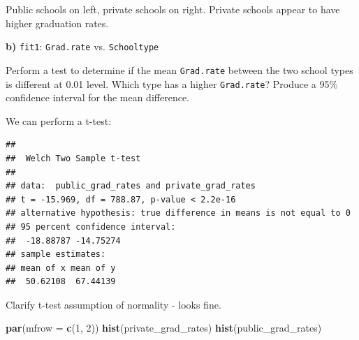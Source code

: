 \documentclass[]{article}
\newenvironment{Shaded}{\begin{snugshade}}{\end{snugshade}}
\newcommand{\KeywordTok}[1]{\textcolor[rgb]{0.13,0.29,0.53}{\textbf{#1}}}
\newcommand{\DataTypeTok}[1]{\textcolor[rgb]{0.13,0.29,0.53}{#1}}
\newcommand{\DecValTok}[1]{\textcolor[rgb]{0.00,0.00,0.81}{#1}}
\newcommand{\StringTok}[1]{\textcolor[rgb]{0.31,0.60,0.02}{#1}}
\newcommand{\OperatorTok}[1]{\textcolor[rgb]{0.81,0.36,0.00}{\textbf{#1}}}
\newcommand{\NormalTok}[1]{#1}
\begin{document}
Public schools on left, private schools on right. Private schools appear
to have higher graduation rates.

\textbf{b)} \texttt{fit1}: \texttt{Grad.rate} vs. \texttt{Schooltype}

Perform a test to determine if the mean \texttt{Grad.rate} between the
two school types is different at 0.01 level. Which type has a higher
\texttt{Grad.rate}? Produce a 95\% confidence interval for the mean
difference.

We can perform a t-test:

\begin{Shaded}
\end{Shaded}

\begin{verbatim}
## 
##  Welch Two Sample t-test
## 
## data:  public_grad_rates and private_grad_rates
## t = -15.969, df = 788.87, p-value < 2.2e-16
## alternative hypothesis: true difference in means is not equal to 0
## 95 percent confidence interval:
##  -18.88787 -14.75274
## sample estimates:
## mean of x mean of y 
##  50.62108  67.44139
\end{verbatim}

Clarify t-test assumption of normality - looks fine.

\begin{Shaded}
\begin{Highlighting}[]
\KeywordTok{par}\NormalTok{(}\DataTypeTok{mfrow =} \KeywordTok{c}\NormalTok{(}\DecValTok{1}\NormalTok{, }\DecValTok{2}\NormalTok{))}
\KeywordTok{hist}\NormalTok{(private_grad_rates)}
\KeywordTok{hist}\NormalTok{(public_grad_rates)}
\end{Highlighting}
\end{Shaded}
\end{document}
